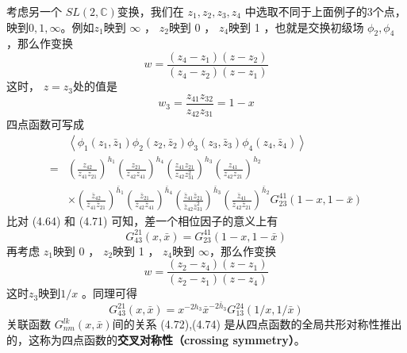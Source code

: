考虑另一个 $SL(2,\mathbb{C}) $变换，我们在 $z_1,z_2,z_3,z_4$ 中选取不同于上面例子的3个点，映到$ 0,1,\infty $。例如$ z_1 $映到 $\infty$ ， $z_2 $映到 0 ， $z_4 $映到 1 ，也就是交换初级场 $\phi_2,\phi_4$ ，那么作变换
\begin{equation}
	w=\frac{\left(z_{4}-z_{1}\right)\left(z-z_{2}\right)}{\left(z_{4}-z_{2}\right)\left(z-z_{1}\right)}
\end{equation}
这时， $z=z_3 $处的值是
\begin{equation}
	w_{3}=\frac{z_{41} z_{32}}{z_{42} z_{31}}=1-x
\end{equation}
四点函数可写成
\begin{equation}
	\begin{aligned} &\left\langle\phi_{1}\left(z_{1}, \bar{z}_{1}\right) \phi_{2}\left(z_{2}, \bar{z}_{2}\right) \phi_{3}\left(z_{3}, \bar{z}_{3}\right) \phi_{4}\left(z_{4}, \bar{z}_{4}\right)\right\rangle \\ =&\left(\frac{z_{42}}{z_{41} z_{21}}\right)^{h_{1}}\left(\frac{z_{21}}{z_{42} z_{41}}\right)^{h_{4}}\left(\frac{z_{41} z_{21}}{z_{42} z_{31}^{2}}\right)^{h_{3}}\left(\frac{z_{41}}{z_{42} z_{21}}\right)^{h_{2}} \\ & \times\left(\frac{\bar{z}_{42}}{\bar{z}_{41} \bar{z}_{21}}\right)^{\bar{h}_{1}}\left(\frac{\bar{z}_{21}}{\bar{z}_{42} \bar{z}_{41}}\right)^{\bar{h}_{4}}\left(\frac{\bar{z}_{41} \bar{z}_{21}}{\bar{z}_{42} \bar{z}_{31}^{2}}\right)^{\bar{h}_{3}}\left(\frac{\bar{z}_{41}}{\bar{z}_{42} \bar{z}_{21}}\right)^{\bar{h}_{2}} G_{23}^{41}(1-x, 1-\bar{x}) \end{aligned}
\end{equation}
比对 (4.64) 和 (4.71) 可知，差一个相位因子的意义上有
\begin{equation}
	G_{43}^{21}(x, \bar{x})=G_{23}^{41}(1-x, 1-\bar{x})
\end{equation}
再考虑 $z_1 $映到 0 ， $z_2 $映到 1 ， $z_4 $映到 $\infty$，那么作变换
\begin{equation}
	w=\frac{\left(z_{2}-z_{4}\right)\left(z-z_{1}\right)}{\left(z_{2}-z_{1}\right)\left(z-z_{4}\right)}
\end{equation}
这时$ z_3 $映到$ 1/x$ 。同理可得
\begin{equation}
	G_{43}^{21}(x, \bar{x})=x^{-2 h_{3}} \bar{x}^{-2 \bar{h}_{3}} G_{13}^{24}\left(1/x, 1/\bar{x}\right)
\end{equation}
关联函数 $G_{n m}^{l k}(x, \bar{x}) $间的关系 (4.72),(4.74) 是从四点函数的全局共形对称性推出的，这称为四点函数的\textbf{交叉对称性（crossing symmetry）}。

